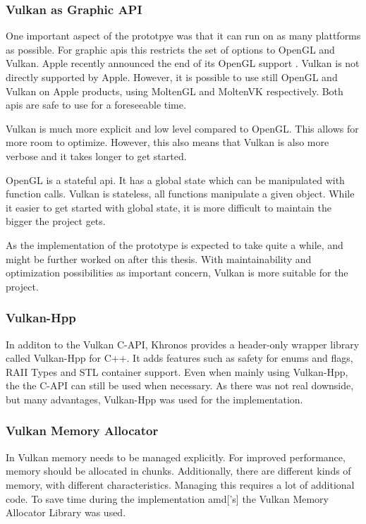 \subsubsection{Vulkan as Graphic API}
One important aspect of the prototpye was that it can run on as many plattforms as possible. %
For graphic \glspl{api} this restricts the set of options to OpenGL and Vulkan. Apple recently announced the end of its OpenGL support \cite{arstechnica:openGL}. Vulkan is not directly supported by Apple. However, it is possible to use still OpenGL and Vulkan on Apple products, using MoltenGL \cite{moltenGL} and MoltenVK \cite{moltenVK} respectively. Both \glspl{api} are safe to use for a foreseeable time.

Vulkan is much more explicit and low level compared to OpenGL. This allows for more room to optimize. However, this also means that Vulkan is also more verbose and it takes longer to get started.

OpenGL is a stateful \gls{api}. It has a global state which can be manipulated with function calls. Vulkan is stateless, all functions manipulate a given object. While it easier to get started with global state, it is more difficult to maintain the bigger the project gets.

As the implementation of the prototype is expected to take quite a while, and might be further worked on after this thesis. With maintainability and optimization possibilities as important concern, Vulkan is more suitable for the project. 


\subsubsection{Vulkan-Hpp}
In additon to the Vulkan C-API, Khronos provides a header-only wrapper library called Vulkan-Hpp for C++. It adds features such as safety for enums and flags, RAII Types and STL container support. Even when mainly using Vulkan-Hpp, the the C-API can still be used when necessary. As there was not real downside, but many advantages, Vulkan-Hpp was used for the implementation.

\subsubsection{Vulkan Memory Allocator}
In Vulkan memory needs to be managed explicitly. For improved performance, memory should be allocated in chunks. Additionally, there are different kinds of memory, with different characteristics. Managing this requires a lot of additional code. To save time during the implementation \gls{amd}['s] the Vulkan Memory Allocator Library \cite{amd:vulkanmemoryallocator} was used.

